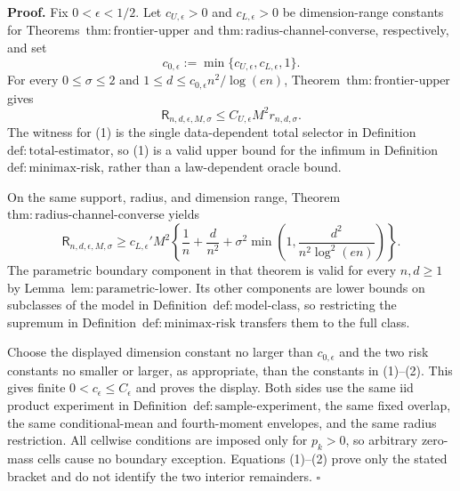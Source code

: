 \textbf{Proof.}
Fix \(0<\epsilon<1/2\).  Let \(c_{U,\epsilon}>0\) and \(c_{L,\epsilon}>0\) be dimension-range constants for Theorems~\(\mathrm{thm:frontier\text{-}upper}\) and \(\mathrm{thm:radius\text{-}channel\text{-}converse}\), respectively, and set
\[
 c_{0,\epsilon}:=\min\{c_{U,\epsilon},c_{L,\epsilon},1\}.
\]
For every \(0\le\sigma\le2\) and \(1\le d\le c_{0,\epsilon}n^2/\log(en)\), Theorem~\(\mathrm{thm:frontier\text{-}upper}\) gives
\[
 \mathsf R_{n,d,\epsilon,M,\sigma}
 \le C_{U,\epsilon}M^2r_{n,d,\sigma}.
\tag{1}
\]
The witness for (1) is the single data-dependent total selector in Definition~\(\mathrm{def:total\text{-}estimator}\), so (1) is a valid upper bound for the infimum in Definition~\(\mathrm{def:minimax\text{-}risk}\), rather than a law-dependent oracle bound.

On the same support, radius, and dimension range, Theorem~\(\mathrm{thm:radius\text{-}channel\text{-}converse}\) yields
\[
 \mathsf R_{n,d,\epsilon,M,\sigma}
 \ge c_{L,\epsilon}'M^2\left\{
 \frac1n+\frac d{n^2}
 +\sigma^2\min\left(1,\frac{d^2}{n^2\log^2(en)}\right)
 \right\}.
\tag{2}
\]
The parametric boundary component in that theorem is valid for every \(n,d\ge1\) by Lemma~\(\mathrm{lem:parametric\text{-}lower}\).  Its other components are lower bounds on subclasses of the model in Definition~\(\mathrm{def:model\text{-}class}\), so restricting the supremum in Definition~\(\mathrm{def:minimax\text{-}risk}\) transfers them to the full class.

Choose the displayed dimension constant no larger than \(c_{0,\epsilon}\) and the two risk constants no smaller or larger, as appropriate, than the constants in (1)--(2).  This gives finite \(0<c_{\epsilon}\le C_{\epsilon}\) and proves the display.  Both sides use the same iid product experiment in Definition~\(\mathrm{def:sample\text{-}experiment}\), the same fixed overlap, the same conditional-mean and fourth-moment envelopes, and the same radius restriction.  All cellwise conditions are imposed only for \(p_k>0\), so arbitrary zero-mass cells cause no boundary exception.  Equations (1)--(2) prove only the stated bracket and do not identify the two interior remainders. \(\square\)